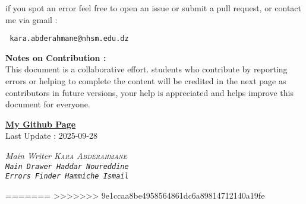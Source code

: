\documentclass{report}
\begin{document}
\begin{titlepage}
  \begin{center}
    if you spot an error feel free to open an issue or
    submit a pull request, or contact me
    via gmail :
  \end{center}
  \begin{center}
    \normalfont
    \texttt{
      \large kara.abderahmane@nhsm.edu.dz
      \normalfont
    }
  \end{center}
  \noindent \textbf{Notes on Contribution : } \\
  This document is a collaborative effort.
  students who contribute by reporting errors or helping to complete the content
  will be credited in the next page as contributors in future versions,
  your help is appreciated and helps improve this document for everyone.
\end{titlepage}
\begin{titlepage}
  \newpage
  \normalfont
  \vfill
  \begin{center}
    \href{https://github.com/Kapa9102}{\textbf{My Github Page}}\\
    \vspace{0.8cm}
    Last Update : 2025-09-28
  \end{center}
  \begin{tcolorbox}[enhanced, colback=yellow!70!orange!20!white, sharp corners, boxrule=1pt,
    attach boxed title to top center = {yshift = -10pt, xshift = 0pt}, colbacktitle=yellow!30!orange!20!white,
    boxed title style = {boxrule=0pt, arc=4pt}, title=\sc\textcolor{black}{Contributors}]
    \begin{center}
      \it Main Writer \hfill \normalfont  \textsc{Kara Abderahmane}  \\
      \vspace{0.5cm}
      \tt Main Drawer \hfill \normalfont  \tt{Haddar Noureddine}  \\
      \vspace{0.5cm}
      \tt Errors Finder \hfill \normalfont  \tt{Hammiche Ismail}  \\
    \end{center}
  \end{tcolorbox}
\end{titlepage}


=======
\tableofcontents
>>>>>>> 9e1ccaa8be4958564861dc6a89814712140a19fe



% 
% 
  
\end{document}
